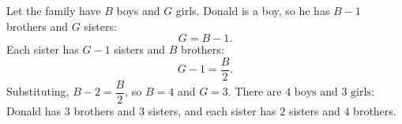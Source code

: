 Let the family have $B$ boys and $G$ girls. Donald is a boy, so he has $B-1$ brothers and $G$ sisters:
\[
G=B-1 .
\]
Each sister has $G-1$ sisters and $B$ brothers:
\[
G-1=\dfrac {B}{2} .
\]
Substituting, $B-2=\dfrac {B}{2}$, so $B=4$ and $G=3$. There are $\boxed{4\text{ boys and }3\text{ girls}}$: Donald has $3$ brothers and $3$ sisters, and each sister has $2$ sisters and $4$ brothers.
